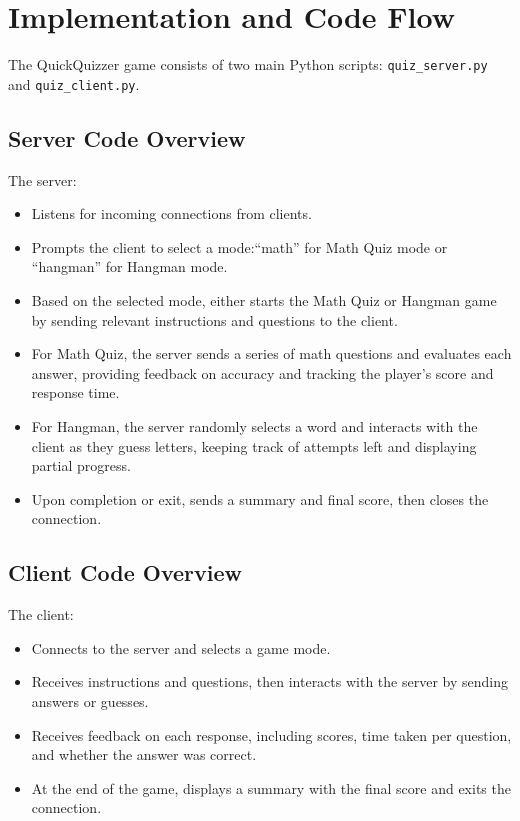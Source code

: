 \documentclass[12pt]{article}
\begin{document}
\newpage
\section{Implementation and Code Flow}
The QuickQuizzer game consists of two main Python scripts: \texttt{quiz\_server.py} and \texttt{quiz\_client.py}.

\subsection{Server Code Overview}
The server:
\begin{itemize}
    \item Listens for incoming connections from clients.
    \item Prompts the client to select a mode:``math'' for Math Quiz mode or ``hangman'' for Hangman mode.
    \item Based on the selected mode, either starts the Math Quiz or Hangman game by sending relevant instructions and questions to the client.
    \item For Math Quiz, the server sends a series of math questions and evaluates each answer, providing feedback on accuracy and tracking the player's score and response time.
    \item For Hangman, the server randomly selects a word and interacts with the client as they guess letters, keeping track of attempts left and displaying partial progress.
    \item Upon completion or exit, sends a summary and final score, then closes the connection.
\end{itemize}

\subsection{Client Code Overview}
The client:
\begin{itemize}
    \item Connects to the server and selects a game mode.
    \item Receives instructions and questions, then interacts with the server by sending answers or guesses.
    \item Receives feedback on each response, including scores, time taken per question, and whether the answer was correct.
    \item At the end of the game, displays a summary with the final score and exits the connection.
\end{itemize}
\end{document}
